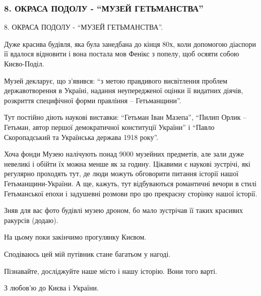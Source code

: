  
 
 
 
 
\subsubsection{8. ОКРАСА ПОДОЛУ - \enquote{МУЗЕЙ ГЕТЬМАНСТВА}}

8. ОКРАСА ПОДОЛУ - \enquote{МУЗЕЙ ГЕТЬМАНСТВА}. 

Дуже красива будівля, яка була занедбана до кінця 80х, коли допомогою діаспори
її вдалося відновити і вона постала мов Фенікс з попелу, щоб осяяти собою
Києво-Поділ.

Музей декларує, що з’явився: \enquote{з метою правдивого висвітлення проблем
державотворення в Україні, надання неупередженої оцінки її видатних діячів,
розкриття специфічної форми правління – Гетьманщини}.

Тут постійно діють наукові виставки: \enquote{Гетьман Іван Мазепа},
\enquote{Пилип Орлик – Гетьман, автор першої демократичної конституції України}
і \enquote{Павло Скоропадський та Українська держава 1918 року}. 

Хоча фонди Музею налічують понад 9000 музейних предметів, але зали дуже
невеликі і обійти їх можна менше як за годину. Цікавими є наукові зустрічі, які
регулярно проходять тут, де люди можуть обговорити питання історії нашої
Гетьманщини-України. А ще, кажуть, тут відбуваються романтичні вечори в стилі
Гетьманської епохи і задушевні розмови про цю прекрасну сторінку нашої історії.

Зняв для вас фото будівлі музею дроном, бо мало зустрічав її таких красивих
ракурсів (додаю). 

На цьому поки закінчимо прогулянку Києвом.

Сподіваюсь цей мій путівник стане багатьом у нагоді.

Пізнавайте, досліджуйте наше місто і нашу історію. Вони того варті.

З любов'ю до Києва і України.

